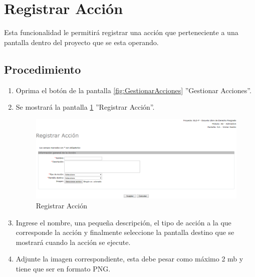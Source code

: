 
\hypertarget{cv:registrarAccion}{\section{Registrar Acción}} \label{sec:registrarAccion}

	Esta funcionalidad le permitirá registrar una acción que perteneciente a una pantalla dentro del proyecto que se esta operando. 

		\subsection{Procedimiento}

			\begin{enumerate}
	
			\item Oprima el botón \IURegistrar{} de la pantalla \ref{fig:GestionarAcciones} ''Gestionar Acciones''.
			
			\item Se mostrará la pantalla \ref{fig:registrarAccion} ''Registrar Acción''.

			\begin{figure}[H]
				\begin{center}
					\includegraphics[scale=0.5]{roles/lider/pantallas/acciones/pantallas/IU11-1-1-1registrarAccion}
					\caption{Registrar Acción}
					\label{fig:registrarAccion}
				\end{center}
			\end{figure}
		
			\item Ingrese el nombre, una pequeña descripción, el tipo de acción a la que corresponde la acción y finalmente seleccione la pantalla destino que se mostrará cuando la acción se ejecute.
			
			\item Adjunte la imagen correspondiente, esta debe pesar como máximo 2 mb y tiene que ser en formato PNG.
			

\end{enumerate}
